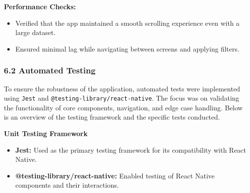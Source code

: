 \documentclass[12pt]{article}
\begin{document}
\textbf{Performance Checks:}
\begin{itemize}
    \item Verified that the app maintained a smooth scrolling experience even with a large dataset.
    \item Ensured minimal lag while navigating between screens and applying filters.
\end{itemize}

\subsubsection*{6.2 Automated Testing}

To ensure the robustness of the application, automated tests were implemented using \texttt{Jest} and \texttt{@testing-library/react-native}. The focus was on validating the functionality of core components, navigation, and edge case handling. Below is an overview of the testing framework and the specific tests conducted.

\clearpage
\bigskip
\textbf{Unit Testing Framework}
\begin{itemize}
    \item \textbf{Jest:} Used as the primary testing framework for its compatibility with React Native.
    \item \textbf{@testing-library/react-native:} Enabled testing of React Native components and their interactions.
\end{itemize}
\end{document}
